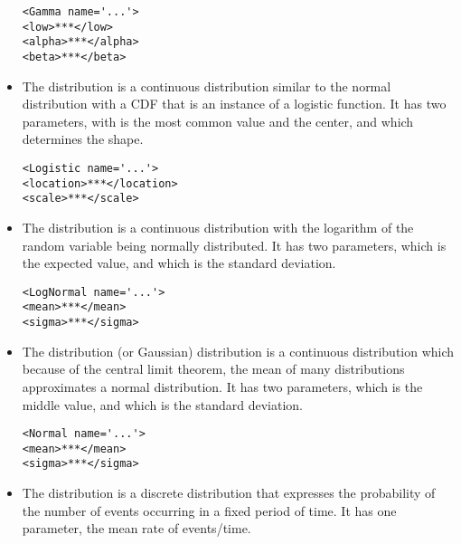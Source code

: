 \begin{itemize}
\begin{lstlisting}[style=XML]
<Gamma name='...'>
<low>***</low>
<alpha>***</alpha>
<beta>***</beta>
\end{lstlisting}


\item The  distribution is a continuous distribution
similar to the normal distribution with a CDF that is an instance of a
logistic function.  It has two parameters,  with
is the most common value and the center, and  which
determines the shape.

\begin{lstlisting}[style=XML]
<Logistic name='...'>
<location>***</location>
<scale>***</scale>
\end{lstlisting}


\item The  distribution is a continuous distribution
with the logarithm of the random variable being normally distributed.
It has two parameters,  which is the expected value,
and  which is the standard deviation.

\begin{lstlisting}[style=XML]
<LogNormal name='...'>
<mean>***</mean>
<sigma>***</sigma>
\end{lstlisting}


\item The  distribution (or Gaussian) distribution is a
continuous distribution which because of the central limit theorem,
the mean of many distributions approximates a normal distribution.  It
has two parameters,  which is the middle value, and
 which is the standard deviation.

\begin{lstlisting}[style=XML]
<Normal name='...'>
<mean>***</mean>
<sigma>***</sigma>
\end{lstlisting}



\item The  distribution is a discrete distribution that
expresses the probability of the number of events occurring in a fixed
period of time.  It has one parameter,  the mean rate
of events/time.


\end{itemize}
